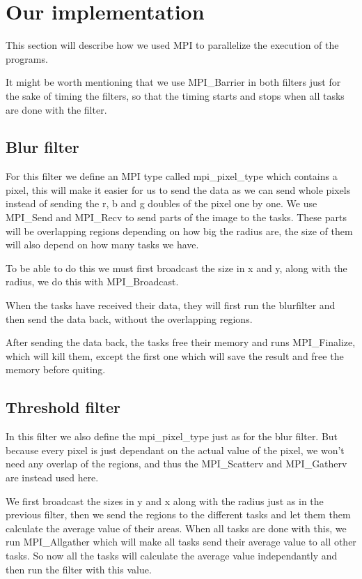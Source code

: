 \documentclass[titlepage, a4paper]{article}
\begin{document}
\section{Our implementation}
This section will describe how we used MPI to parallelize the execution of the programs.

It might be worth mentioning that we use MPI\_Barrier in both filters just for the sake of timing the filters, so that the timing starts and stops when all tasks are done with the filter.

\subsection{Blur filter}
For this filter we define an MPI type called mpi\_pixel\_type which contains a pixel, this will make it easier for us to send the data as we can send whole pixels instead of sending the r, b and g doubles of the pixel one by one. We use MPI\_Send and MPI\_Recv to send parts of the image to the tasks. These parts will be overlapping regions depending on how big the radius are, the size of them will also depend on how many tasks we have.

To be able to do this we must first broadcast the size in x and y, along with the radius, we do this with MPI\_Broadcast.

When the tasks have received their data, they will first run the blurfilter and then send the data back, without the overlapping regions.

After sending the data back, the tasks free their memory and runs MPI\_Finalize, which will kill them, except the first one which will save the result and free the memory before quiting.

\subsection{Threshold filter}
In this filter we also define the mpi\_pixel\_type just as for the blur filter. But because every pixel is just dependant on the actual value of the pixel, we won't need any overlap of the regions, and thus the MPI\_Scatterv and MPI\_Gatherv are instead used here.

We first broadcast the sizes in y and x along with the radius just as in the previous filter, then we send the regions to the different tasks and let them them calculate the average value of their areas. When all tasks are done with this, we run MPI\_Allgather which will make all tasks send their average value to all other tasks. So now all the tasks will calculate the average value independantly and then run the filter with this value.
\end{document}
